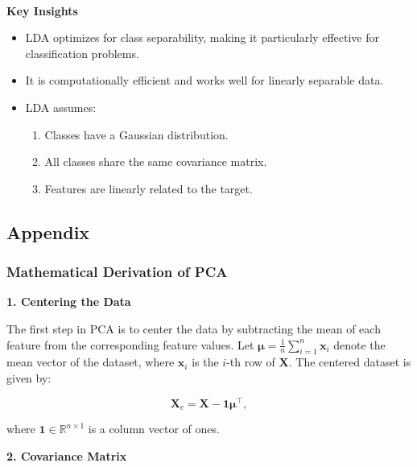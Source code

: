 \documentclass{article}
\providecommand{\tightlist}{%
      \setlength{\itemsep}{0pt}\setlength{\parskip}{0pt}}
\begin{document}
    \begin{center}
    \end{center}
    { \hspace*{\fill} \\}
    
    \textbf{Key Insights}

\begin{itemize}
\tightlist
\item
  LDA optimizes for class separability, making it particularly effective
  for classification problems.
\item
  It is computationally efficient and works well for linearly separable
  data.
\item
  LDA assumes:

  \begin{enumerate}
  \def\labelenumi{\arabic{enumi}.}
  \tightlist
  \item
    Classes have a Gaussian distribution.
  \item
    All classes share the same covariance matrix.
  \item
    Features are linearly related to the target.
  \end{enumerate}
\end{itemize}

    \subsection{Appendix}\label{appendix}

    \subsubsection{Mathematical Derivation of
PCA}\label{mathematical-derivation-of-pca}

\textbf{1. Centering the Data}

The first step in PCA is to center the data by subtracting the mean of
each feature from the corresponding feature values. Let
\(\mathbf{\mu} = \frac{1}{n} \sum_{i=1}^n \mathbf{x}_i\) denote the mean
vector of the dataset, where \(\mathbf{x}_i\) is the \(i\)-th row of
\(\mathbf{X}\). The centered dataset is given by:

\[
\mathbf{X}_c = \mathbf{X} - \mathbf{1}\mathbf{\mu}^\top,
\]

where \(\mathbf{1} \in \mathbb{R}^{n \times 1}\) is a column vector of
ones.

    \textbf{2. Covariance Matrix}
\end{document}
